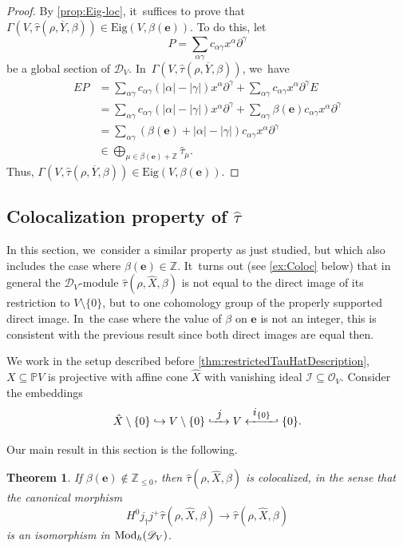 \documentclass[JEP,XML,SOM,Unicode,published]{cedram}
\let\mathds\mathbb
\newcommand\hto{\mathrel{\lhook\joinrel\to}}
\newcommand{\To}[1]{\mathchoice{\xrightarrow{\textstyle\kern4pt#1\kern3pt}}{\xrightarrow{\,#1\,}}{}{}}
\newcommand\Hto[1]{\mathrel{\lhook\joinrel\To{#1}}}
\newcommand{\From}[1]{\mathchoice{\xleftarrow{\textstyle~#1~}}{\xleftarrow{\,#1\,}}{}{}}
\newcommand\Hfrom[1]{\mathrel{\From{#1}\joinrel\rhook}}
\newcommand{\bme}{{\boldsymbol{e}}}
\newcommand{\Eig}{\mathrm{Eig}}
\newtheorem{thm}{Theorem}[section]
\newcommand{\dZ}{{\mathds Z}}\let\mbz\dZ\let\Z\dZ
\newcommand{\dP}{{\mathds P}}\let\P\dP
\newcommand{\cD}{\mathscr{D}}
\newcommand{\cI}{\mathcal{I}}
\newcommand{\cO}{\mathcal{O}}\let\O\cO
\begin{document}
\begin{proof}
By \cref{prop:Eig-loc}, it~suffices to prove that $\Gamma(V, \hat\tau(\rho, \overline Y, \beta))\in \Eig(V,\beta(\bme))$. To do this, let
\[
P= \sum_{\alpha\gamma} c_{\alpha\gamma} x^\alpha\partial^\gamma
\]
be a global section of $\mathscr{D}_V$. In~$\Gamma(V, \hat\tau(\rho, \overline Y, \beta))$, we~have
\begin{align*}
EP &= \sum_{\alpha\gamma} c_{\alpha\gamma} (|\alpha| - |\gamma|)x^\alpha\partial^\gamma + \sum_{\alpha\gamma} c_{\alpha\gamma} x^\alpha\partial^\gamma E\\
&= \sum_{\alpha\gamma} c_{\alpha\gamma} (|\alpha| - |\gamma|)x^\alpha\partial^\gamma + \sum_{\alpha\gamma} \beta(\bme)c_{\alpha\gamma} x^\alpha\partial^\gamma\\
&= \sum_{\alpha\gamma} (\beta(\bme) + |\alpha| - |\gamma|)c_{\alpha\gamma}x^\alpha\partial^\gamma\\
&\in \bigoplus_{\mu \in \beta(\bme) + \Z} \hat\tau_\mu.
\end{align*}
Thus, $\Gamma(V, \hat\tau(\rho, \overline Y, \beta))\in \Eig(V,\beta(\bme))$.
\end{proof}

\subsection{Colocalization property of \texorpdfstring{$\widehat{\tau}$}{\textbackslash hat\textbackslash tau}}
\label{subsec:CoLocProp}

In this section, we~consider a similar property as just studied, but which also includes the case where $\beta(\bme)\in \dZ$. It~turns out (see \cref{ex:Coloc} below) that in general the $\cD_V$\nobreakdash-mod\-ule $\hat{\tau}(\rho, \hat{X}, \beta)$ is not equal to the direct image of its restriction to $V\setminus \{0\}$, but to one cohomology group of the properly supported direct image. In~the case where the value of $\beta$ on $\bme$ is not an integer, this is consistent with the previous result since both direct images are equal then.

We work in the setup described before \cref{thm:restrictedTauHatDescription}, \ie $X\subseteq \dP V$ is projective with affine cone $\hat{X}$ with vanishing ideal $\cI\subseteq \cO_V$. Consider the embeddings
\[
\hat{X} \setminus \{0\} \hto V\setminus\{0\} \Hto{j} V\Hfrom{i_{\{0\}}} \{0\}.
\]

Our main result in this section is the following.

\begin{thm}\label{theo:coloc}
If $\beta(\bme)\notin \dZ_{\leq 0}$, then
$\hat{\tau}(\rho, \hat{X}, \beta)$ is colocalized, in the sense that the canonical morphism
\[
H^0j_\dag j^+ \hat{\tau}(\rho, \hat{X}, \beta) \to \hat{\tau}(\rho, \hat{X}, \beta)
\]
is an isomorphism in $\textup{Mod}_h(\cD_V)$.
\end{thm}
\end{document}
